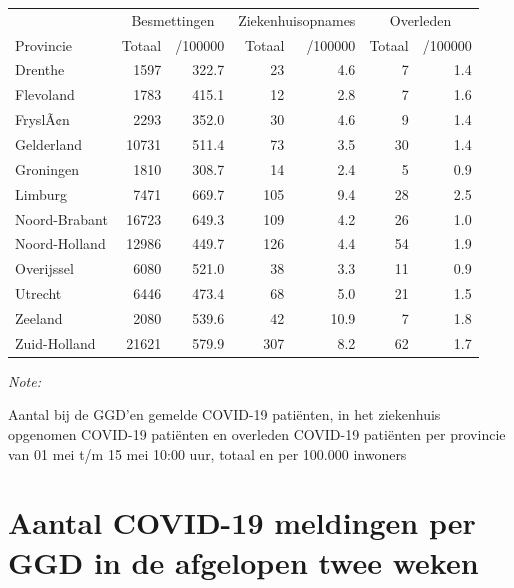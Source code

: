 \documentclass[
  english,
  man,floatsintext]{apa6}
\begin{document}
\begin{table}
\centering
\begin{threeparttable}
\begin{tabular}{lrrrrrr}
\toprule
\multicolumn{1}{c}{ } & \multicolumn{2}{c}{Besmettingen} & \multicolumn{2}{c}{Ziekenhuisopnames} & \multicolumn{2}{c}{Overleden} \\
\cmidrule(l{3pt}r{3pt}){2-3} \cmidrule(l{3pt}r{3pt}){4-5} \cmidrule(l{3pt}r{3pt}){6-7}
Provincie & Totaal & /100000 & Totaal & /100000 & Totaal & /100000\\
\midrule
Drenthe & 1597 & 322.7 & 23 & 4.6 & 7 & 1.4\\
Flevoland & 1783 & 415.1 & 12 & 2.8 & 7 & 1.6\\
FryslÃ¢n & 2293 & 352.0 & 30 & 4.6 & 9 & 1.4\\
Gelderland & 10731 & 511.4 & 73 & 3.5 & 30 & 1.4\\
Groningen & 1810 & 308.7 & 14 & 2.4 & 5 & 0.9\\
Limburg & 7471 & 669.7 & 105 & 9.4 & 28 & 2.5\\
Noord-Brabant & 16723 & 649.3 & 109 & 4.2 & 26 & 1.0\\
Noord-Holland & 12986 & 449.7 & 126 & 4.4 & 54 & 1.9\\
Overijssel & 6080 & 521.0 & 38 & 3.3 & 11 & 0.9\\
Utrecht & 6446 & 473.4 & 68 & 5.0 & 21 & 1.5\\
Zeeland & 2080 & 539.6 & 42 & 10.9 & 7 & 1.8\\
Zuid-Holland & 21621 & 579.9 & 307 & 8.2 & 62 & 1.7\\
\bottomrule
\end{tabular}
\begin{tablenotes}
\item \textit{Note: } 
\item Aantal bij de GGD’en gemelde COVID-19 patiënten, in het ziekenhuis opgenomen COVID-19 patiënten en overleden COVID-19 patiënten per provincie van 01 mei t/m 15 mei 10:00 uur, totaal en per 100.000 inwoners
\end{tablenotes}
\end{threeparttable}
\end{table}

\newpage

\hypertarget{aantal-covid-19-meldingen-per-ggd-in-de-afgelopen-twee-weken}{%
\section{Aantal COVID-19 meldingen per GGD in de afgelopen twee weken}\label{aantal-covid-19-meldingen-per-ggd-in-de-afgelopen-twee-weken}}
\end{document}
